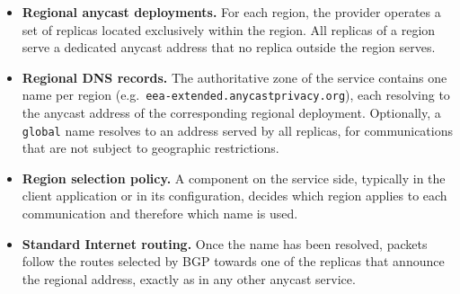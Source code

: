 \documentclass[
A4paper,                %
twoside,                %
openright,              %
chapterprefix=true,     %
12pt,                   %
headings=normal,        %
titlepage=on            %
]{book}
\begin{document}
\begin{itemize}
    \item \textbf{Regional anycast deployments.} For each region, the provider operates a set of replicas located exclusively within the region. All replicas of a region serve a dedicated anycast address that no replica outside the region serves.

    \item \textbf{Regional DNS records.} The authoritative zone of the service contains one name per region (e.g.\ \texttt{eea-extended.anycastprivacy.org}), each resolving to the anycast address of the corresponding regional deployment. Optionally, a \texttt{global} name resolves to an address served by all replicas, for communications that are not subject to geographic restrictions.

    \item \textbf{Region selection policy.} A component on the service side, typically in the client application or in its configuration, decides which region applies to each communication and therefore which name is used.

    \item \textbf{Standard Internet routing.} Once the name has been resolved, packets follow the routes selected by BGP towards one of the replicas that announce the regional address, exactly as in any other anycast service.
\end{itemize}
\end{document}
